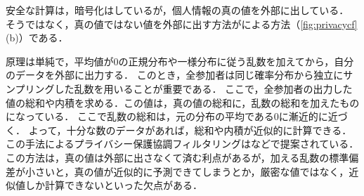 安全な計算は，暗号化はしているが，個人情報の真の値を外部に出している．
そうではなく，真の値ではない値を外部に出す方法がによる方法（\ref{fig:privacycf}(b)）である．

原理は単純で，平均値が0の正規分布や一様分布に従う乱数を加えてから，自分のデータを外部に出力する．
このとき，全参加者は同じ確率分布から独立にサンプリングした乱数を用いることが重要である．
ここで，全参加者の出力した値の総和や内積を求める．この値は，真の値の総和に，乱数の総和を加えたものになっている．
ここで乱数の総和は，元の分布の平均である$0$に漸近的に近づく．
よって，十分な数のデータがあれば，総和や内積が近似的に計算できる．
この手法によるプライバシー保護協調フィルタリングは\cite{icdm:03:01}などで提案されている．
この方法は，真の値は外部に出さなくて済む利点があるが，加える乱数の標準偏差が小さいと，真の値が近似的に予測できてしまうとか，厳密な値ではなく，近似値しか計算できないといった欠点がある．
